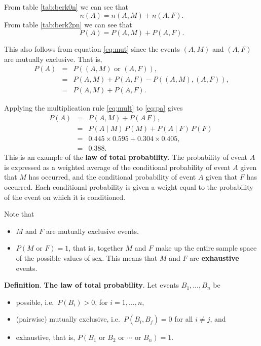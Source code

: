 \documentclass[
  11pt,
  british,
  openany, a4paper]{book}
\providecommand{\tightlist}{%
  \setlength{\itemsep}{0pt}\setlength{\parskip}{0pt}}
\begin{document}
From table \ref{tab:berk0n} we can see that
\[ n(A) = n(A , M) + n(A , F). \]
From table \ref{tab:berk2pn} we can see that
\begin{equation}
P(A) = P(A , M) + P(A , F). 
\label{eq:pa}
\end{equation}

This also follows from equation \eqref{eq:mut} since the events \((A , M)\) and \((A , F)\) are mutually exclusive. That is,
\begin{eqnarray}
 P(A) &=& P((A , M) \mbox{ or } (A , F) ), \\
 &=& P(A , M) + P(A , F) - P((A , M) , (A , F)), \\
 &=& P(A , M) + P(A , F). 
\end{eqnarray}

Applying the multiplication rule \eqref{eq:mult} to \eqref{eq:pa} gives
\begin{eqnarray}
P(A) &=& P(A , M) + P(A \, F), \\
     &=& P(A \mid M)\,P(M) + P(A \mid F)\,P(F)\ \\
     &=& 0.445 \times 0.595 + 0.304 \times 0.405, \\
     &=& 0.388.
\end{eqnarray}
This is an example of the \textbf{law of total probability}. The probability of event \(A\) is expressed as a weighted average of the conditional probability of event \(A\) given that \(M\) has occurred, and the conditional probability of event \(A\) given that \(F\) has occurred. Each conditional probability is given a weight equal to the probability of the event on which it is conditioned.

Note that

\begin{itemize}
\tightlist
\item
  \(M\) and \(F\) are mutually exclusive events.
\item
  \(P(M \mbox{ or } F) = 1\), that is, together \(M\) and \(F\) make up the entire sample space of the possible values of sex. This means that \(M\) and \(F\) are \textbf{exhaustive} events.
\end{itemize}

\textbf{Definition}. \textbf{The law of total probability}. Let events \(B_1, \ldots, B_n\) be

\begin{itemize}
\tightlist
\item
  possible, i.e.~\(P(B_i) > 0\), for \(i = 1, \ldots, n\),
\item
  (pairwise) mutually exclusive, i.e.~\(P(B_i , B_j)=0\) for all \(i \neq j\), and
\item
  exhaustive, that is, \(P(B_1 \mbox{ or } B_2 \mbox{ or } \cdots \mbox{ or } B_n) = 1\).
\end{itemize}
\end{document}
